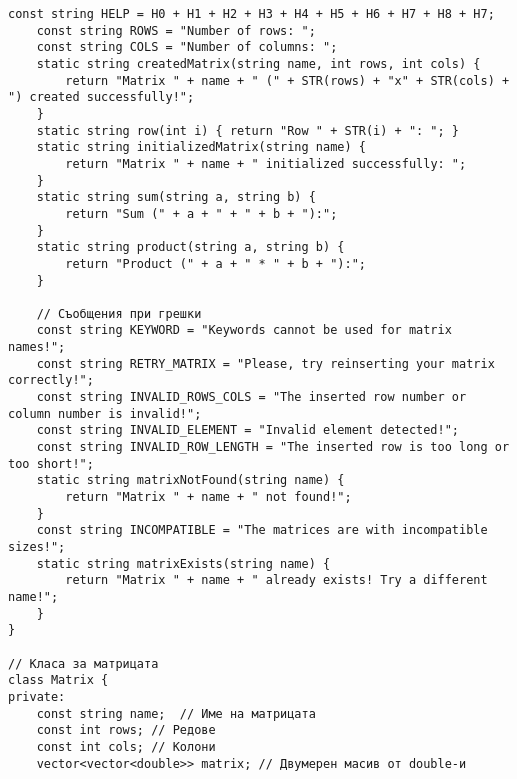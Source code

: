 \documentclass[oneside]{book}
\begin{document}
\begin{mdframed}\begin{lstlisting}[firstnumber=last]
	const string HELP = H0 + H1 + H2 + H3 + H4 + H5 + H6 + H7 + H8 + H7;
	const string ROWS = "Number of rows: ";
	const string COLS = "Number of columns: ";
	static string createdMatrix(string name, int rows, int cols) {
		return "Matrix " + name + " (" + STR(rows) + "x" + STR(cols) + ") created successfully!";
	}
	static string row(int i) { return "Row " + STR(i) + ": "; }
	static string initializedMatrix(string name) {
		return "Matrix " + name + " initialized successfully: ";
	}
	static string sum(string a, string b) {
        return "Sum (" + a + " + " + b + "):";
    }
	static string product(string a, string b) {
        return "Product (" + a + " * " + b + "):";
    }

	// Съобщения при грешки
	const string KEYWORD = "Keywords cannot be used for matrix names!";
	const string RETRY_MATRIX = "Please, try reinserting your matrix correctly!";
	const string INVALID_ROWS_COLS = "The inserted row number or column number is invalid!";
	const string INVALID_ELEMENT = "Invalid element detected!";
	const string INVALID_ROW_LENGTH = "The inserted row is too long or too short!";
    static string matrixNotFound(string name) {
		return "Matrix " + name + " not found!";
	}
	const string INCOMPATIBLE = "The matrices are with incompatible sizes!";
	static string matrixExists(string name) {
		return "Matrix " + name + " already exists! Try a different name!";
	}
}

// Класа за матрицата
class Matrix {
private:
	const string name;	// Име на матрицата
	const int rows;	// Редове
	const int cols;	// Колони
	vector<vector<double>> matrix; // Двумерен масив от double-и
\end{lstlisting}\end{mdframed}\vspace{-12pt}
\end{document}
